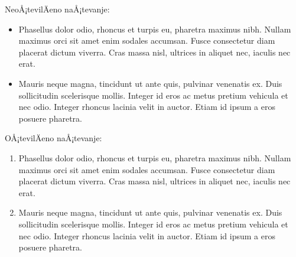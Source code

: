 \documentclass[a4paper]{article}
\begin{document}
NeoÅ¡tevilÄeno naÅ¡tevanje:
%
\begin{itemize}

\item Phasellus dolor odio, rhoncus et turpis eu, pharetra maximus nibh. Nullam maximus
  orci sit amet enim sodales accumsan. Fusce consectetur diam placerat dictum viverra.
  Cras massa nisl, ultrices in aliquet nec, iaculis nec erat.

\item Mauris neque magna, tincidunt ut ante quis, pulvinar venenatis ex. Duis sollicitudin
  scelerisque mollis. Integer id eros ac metus pretium vehicula et nec odio. Integer
  rhoncus lacinia velit in auctor. Etiam id ipsum a eros posuere pharetra.
\end{itemize}

OÅ¡tevilÄeno naÅ¡tevanje:
%
\begin{enumerate}

\item Phasellus dolor odio, rhoncus et turpis eu, pharetra maximus nibh. Nullam maximus
  orci sit amet enim sodales accumsan. Fusce consectetur diam placerat dictum viverra.
  Cras massa nisl, ultrices in aliquet nec, iaculis nec erat.

\item Mauris neque magna, tincidunt ut ante quis, pulvinar venenatis ex. Duis sollicitudin
  scelerisque mollis. Integer id eros ac metus pretium vehicula et nec odio. Integer
  rhoncus lacinia velit in auctor. Etiam id ipsum a eros posuere pharetra.
\end{enumerate}
\end{document}
